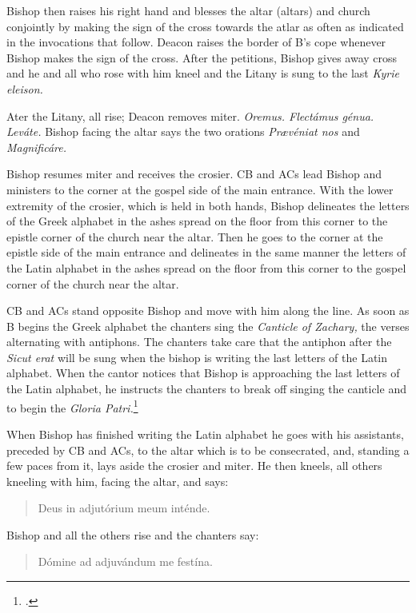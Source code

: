 \documentclass[letterpaper]{report}
\begin{document}
{Bishop then raises his right hand and blesses the altar (altars) and church
conjointly by making the sign of the cross towards the atlar as often as
indicated in the invocations that follow. Deacon raises the border of B's cope
whenever Bishop makes the sign of the cross. After the petitions, Bishop gives away cross
and he and all who rose with him kneel and the Litany is sung to the last
\textit{Kyrie eleison.}

\rubric Ater the Litany, all rise; Deacon removes miter. \textit{Oremus. Flectámus
génua. Leváte.} Bishop facing the altar says the two orations \textit{Pr\ae véniat
nos} and \textit{Magnificáre.}

\rubric Bishop resumes miter and receives the crosier. CB and ACs lead Bishop and
ministers to the corner at the gospel side of the main entrance. With the lower
extremity of the crosier, which is held in both hands, Bishop delineates the letters
of the Greek alphabet in the ashes spread on the floor from this corner to the
epistle corner of the church near the altar. Then he goes to the corner at the
epistle side of the main entrance and delineates in the same manner the letters
of the Latin alphabet in the ashes spread on the floor from this corner to the
gospel corner of the church near the altar.

CB and ACs stand opposite Bishop and move with him along the line. As soon as B
begins the Greek alphabet the chanters sing the \textit{Canticle of Zachary,}
the verses alternating with antiphons. The chanters take care that the antiphon
after the \textit{Sicut erat} will be sung when the bishop is writing the last
letters of the Latin alphabet. When the cantor notices that Bishop is approaching
the last letters of the Latin alphabet, he instructs the chanters to break off
singing the canticle and to begin the \textit{Gloria Patri.}\footcite[][p.
56.]{consecranda}

\rubric When Bishop has finished writing the Latin alphabet he goes with his
assistants, preceded by CB and ACs, to the altar which is to be consecrated,
and, standing a few paces from it, lays aside the crosier and miter. He then
kneels, all others kneeling with him, facing the altar, and says:

\begin{quote}
    \vbar Deus in adjutórium meum inténde.
\end{quote}

Bishop and all the others rise and the chanters say:

\begin{quote}
    \rbar Dómine ad adjuvándum me festína.
\end{quote}

}
\end{document}
